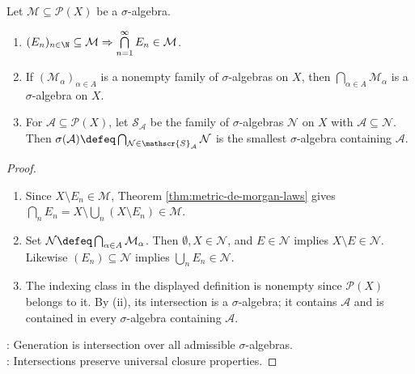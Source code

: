 \begin{proposition} \label{prop:sigma-algebra-closure-and-generation} \\
Let $\mathcal{M}\subseteq\mathcal{P}(X)$ be a $\sigma$-algebra.
\begin{enumerate}[label=(\roman*)]
\setlength{\itemsep}{0pt}
\item $(E_n)_{n\in\N}\subseteq\mathcal{M}\Rightarrow\bigcap\limits_{n=1}^{\infty}E_n\in\mathcal{M}$.
\item If $(\mathcal{M}_\alpha)_{\alpha\in A}$ is a nonempty family of $\sigma$-algebras on $X$, then $\bigcap\limits_{\alpha\in A}\mathcal{M}_\alpha$ is a $\sigma$-algebra on $X$.
\item For $\mathcal{A}\subseteq\mathcal{P}(X)$, let $\mathscr{S}_{\mathcal{A}}$ be the family of $\sigma$-algebras $\mathcal{N}$ on $X$ with $\mathcal{A}\subseteq\mathcal{N}$.\\
Then $\sigma(\mathcal{A})\defeq\bigcap_{\mathcal{N}\in\mathscr{S}_{\mathcal{A}}}\mathcal{N}$ is the smallest $\sigma$-algebra containing $\mathcal{A}$.
\end{enumerate}
\begin{proof}
\begin{enumerate}[label=(\roman*)]
\setlength{\itemsep}{0pt}
\item Since $X\setminus E_n\in\mathcal{M}$, Theorem \ref{thm:metric-de-morgan-laws} gives $\bigcap_nE_n=X\setminus\bigcup_n(X\setminus E_n)\in\mathcal{M}$.
\item Set $\mathcal{N}\defeq\bigcap_{\alpha\in A}\mathcal{M}_\alpha$. Then $\emptyset,X\in\mathcal{N}$, and $E\in\mathcal{N}$ implies $X\setminus E\in\mathcal{N}$.\\
Likewise $(E_n)\subseteq\mathcal{N}$ implies $\bigcup_nE_n\in\mathcal{N}$.
\item The indexing class in the displayed definition is nonempty since $\mathcal{P}(X)$ belongs to it. By (ii), its intersection is a $\sigma$-algebra; it contains $\mathcal{A}$ and is contained in every $\sigma$-algebra containing $\mathcal{A}$.
\end{enumerate}
: Generation is intersection over all admissible $\sigma$-algebras.\\
: Intersections preserve universal closure properties.
\end{proof}
\end{proposition}


